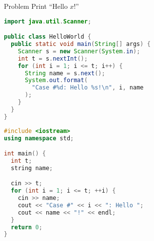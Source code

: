 \begin{slide}
  \begin{block}{Problem}
    Print ``Hello $x$!''
  \end{block}
\end{slide}

\begin{fragileslide}
\begin{lstlisting}[language=java,basicstyle=\small]
import java.util.Scanner;

public class HelloWorld {
  public static void main(String[] args) {
    Scanner s = new Scanner(System.in);   
    int t = s.nextInt();
    for (int i = 1; i <= t; i++) {
      String name = s.next();
      System.out.format(
        "Case #%d: Hello %s!\n", i, name
      );
    }
  }
}
\end{lstlisting}
\end{fragileslide}

\begin{fragileslide}
\begin{lstlisting}[language=c++,basicstyle=\small]
#include <iostream>
using namespace std;

int main() {
  int t;
  string name;

  cin >> t;
  for (int i = 1; i <= t; ++i) {
    cin >> name;
    cout << "Case #" << i << ": Hello ";
    cout << name << "!" << endl;
  }
  return 0;
}
\end{lstlisting}
\end{fragileslide}